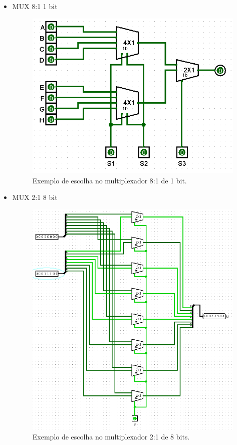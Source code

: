 \documentclass[
	12pt,				%
	openright,			%
	twoside,			%
	a4paper,			%
	english,			%
	french,				%
	spanish,			%
	brazil,				%
	]{abntex2}
\begin{document}
\begin{apendicesenv}
\begin{itemize}
\newpage
\item {MUX 8:1 1 bit}
\begin{figure}[H]
	\begin{center}
	    \includegraphics[scale=0.4]{imagens/mux811teste.png}
	\end{center}
\caption{\label{mux811teste}Exemplo de escolha no multiplexador 8:1 de 1 bit.}
\end{figure}

\item {MUX 2:1 8 bit}
\begin{figure}[H]
	\begin{center}
	    \includegraphics[scale=0.45]{imagens/mux218teste.png}
	\end{center}
\caption{\label{mux218teste}Exemplo de escolha no multiplexador 2:1 de 8 bits.}
\end{figure}


\end{itemize}
\end{apendicesenv}
\end{document}
